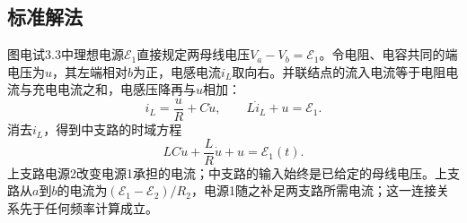 \documentclass[UTF8,fontset=fandol,a4paper,11pt]{ctexart}
\begin{document}


\subsection*{标准解法}


图电试3.3中理想电源$\mathcal E_1$直接规定两母线电压$V_a-V_b=\mathcal E_1$。令电阻、电容共同的端电压为$u$，其左端相对$b$为正，电感电流$i_L$取向右。并联结点的流入电流等于电阻电流与充电电流之和，电感压降再与$u$相加：
\[
i_L=\frac uR+C\dot u,\qquad
L\dot i_L+u=\mathcal E_1.
\]
消去$i_L$，得到中支路的时域方程
\[
\boxed{LC\ddot u+\frac LR\dot u+u=\mathcal E_1(t)}.
\]
上支路电源2改变电源1承担的电流；中支路的输入始终是已给定的母线电压。上支路从$a$到$b$的电流为$(\mathcal E_1-\mathcal E_2)/R_2$，电源1随之补足两支路所需电流；这一连接关系先于任何频率计算成立。
\end{document}
